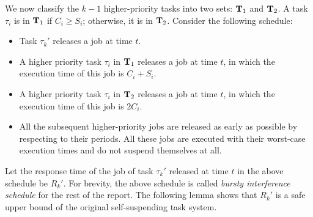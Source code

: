 We now classify the $k-1$ higher-priority tasks into two sets: ${\bf T}_1$ and ${\bf T}_2$. A task $\tau_i$ is in ${\bf T}_1$ if $C_i \geq S_i$; otherwise, it is in ${\bf T}_2$.
Consider the following schedule:
\begin{itemize}
\item Task $\tau_k'$ releases a job at time $t$.
\item A higher priority task $\tau_i$ in ${\bf T}_1$ releases a job at time $t$, in which the execution time of this job is $C_i+S_i$.
\item A higher priority task $\tau_i$ in ${\bf T}_2$ releases a job at time $t$, in which the execution time of this job is $2C_i$.
\item All the subsequent higher-priority jobs are released as early as possible by respecting to their periods. All these jobs are executed with their worst-case execution times and do not suspend themselves at all.
\end{itemize}

Let the response time of the job of task $\tau_k'$ released at time $t$ in the above schedule be $R_k'$. For brevity, the above schedule is called \emph{bursty interference schedule} for the rest of the report. The following lemma shows that $R_k'$ is a safe upper bound of the original self-suspending task system. 

